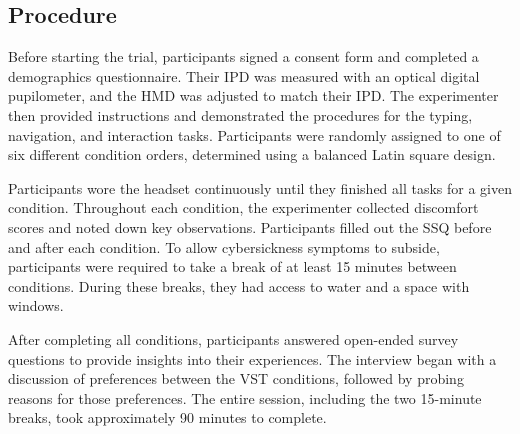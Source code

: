\subsection{Procedure}
Before starting the trial, participants signed a consent form and completed a demographics questionnaire. Their IPD was measured with an optical digital pupilometer, and the HMD was adjusted to match their IPD. The experimenter then provided instructions and demonstrated the procedures for the typing, navigation, and interaction tasks. Participants were randomly assigned to one of six different condition orders,  determined using a balanced Latin square design. 

Participants wore the headset continuously until they finished all tasks for a given condition. Throughout each condition, the experimenter collected discomfort scores and noted down key observations. Participants filled out the SSQ before and after each condition. To allow cybersickness symptoms to subside, participants were required to take a break of at least 15 minutes between conditions. During these breaks, they had access to water and a space with windows.

After completing all conditions, participants answered open-ended survey questions to provide insights into their experiences. The interview began with a discussion of preferences between the VST conditions, followed by probing reasons for those preferences. The entire session, including the two 15-minute breaks, took approximately 90 minutes to complete.

